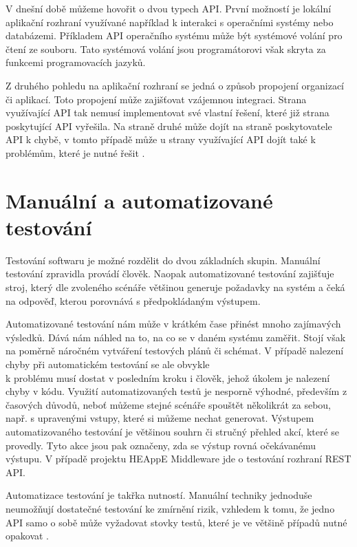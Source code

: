V dnešní době můžeme hovořit o dvou typech API. První možností je lokální aplikační rozhraní využívané například k interakci s operačními systémy nebo databázemi. Příkladem API operačního systému může být systémové volání pro čtení ze souboru. Tato systémová volání jsou programátorovi však skryta za funkcemi programovacích jazyků.

Z druhého pohledu na aplikační rozhraní se jedná o způsob propojení organizací či aplikací. Toto propojení může zajišťovat vzájemnou integraci. Strana využívající API tak nemusí implementovat své vlastní řešení, které již strana poskytující API vyřešila. Na straně druhé může dojít na straně poskytovatele API k chybě, v tomto případě může u strany využívající API dojít také k problémům, které je nutné řešit \cite{Mitchell2015}.


\section{Manuální a automatizované testování}
Testování softwaru je možné rozdělit do dvou základních skupin. Manuální testování zpravidla provádí člověk. Naopak automatizované testování zajišťuje stroj, který dle zvoleného scénáře většinou generuje požadavky na systém a čeká na odpověď, kterou porovnává s předpokládaným výstupem.

Automatizované testování nám může v krátkém čase přinést mnoho zajímavých výsledků. Dává nám náhled na to, na co se v daném systému zaměřit. Stojí však na poměrně náročném vytváření testových plánů či schémat. V případě nalezení chyby při automatickém testování se ale obvykle \\k problému musí dostat v posledním kroku i člověk, jehož úkolem je nalezení chyby v kódu. Využití automatizovaných testů je nesporně výhodné, především z časových důvodů, neboť můžeme stejné scénáře spouštět několikrát za sebou, např. s upravenými vstupy, které si můžeme nechat generovat. Výstupem automatizovaného testování je většinou souhrn či stručný přehled akcí, které se provedly. Tyto akce jsou pak označeny, zda se výstup rovná očekávanému výstupu. V případě projektu HEAppE Middleware jde o testování rozhraní REST API.

Automatizace testování je takřka nutností. Manuální techniky jednoduše neumožňují dostatečné testování ke zmírnění rizik, vzhledem k tomu, že jedno API samo o sobě může vyžadovat stovky testů, které je ve většině případů nutné opakovat \cite{Mitchell2015}.



